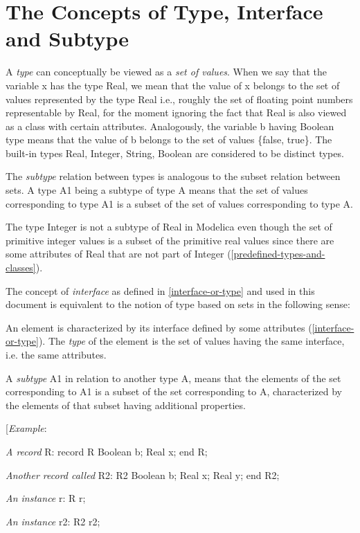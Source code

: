 \documentclass[10pt,a4paper]{report}
\def\doublelabel#1{\label{#1}}
\begin{document}
\section{The Concepts of Type, Interface and Subtype}\doublelabel{the-concepts-of-type-interface-and-subtype}

A \emph{type} can conceptually be viewed as a \emph{set of values}. When
we say that the variable x has the type Real, we mean that the value of
x belongs to the set of values represented by the type Real i.e.,
roughly the set of floating point numbers representable by Real, for the
moment ignoring the fact that Real is also viewed as a class with
certain attributes. Analogously, the variable b having Boolean type
means that the value of b belongs to the set of values \{false, true\}.
The built-in types Real, Integer, String, Boolean are considered to be
distinct types.

The \emph{subtype} relation between types is analogous to the subset
relation between sets. A type A1 being a subtype of type A means that
the set of values corresponding to type A1 is a subset of the set of
values corresponding to type A.

The type Integer is not a subtype of Real in Modelica even though the
set of primitive integer values is a subset of the primitive real values
since there are some attributes of Real that are not part of Integer
(\ref{predefined-types-and-classes}).

The concept of \emph{interface} as defined in \ref{interface-or-type} and used in
this document is equivalent to the notion of type based on sets in the
following sense:

An element is characterized by its interface defined by some attributes
(\ref{interface-or-type}). The \emph{type} of the element is the set of values
having the same interface, i.e. the same attributes.

A \emph{subtype} A1 in relation to another type A, means that the
elements of the set corresponding to A1 is a subset of the set
corresponding to A, characterized by the elements of that subset having
additional properties.

{[}\emph{Example}:

\emph{A record} R: record R Boolean b; Real x; end R;

\emph{Another record called} R2: R2 Boolean b; Real x; Real y; end R2;

\emph{An instance} r: R r;

\emph{An instance} r2: R2 r2;
\end{document}
